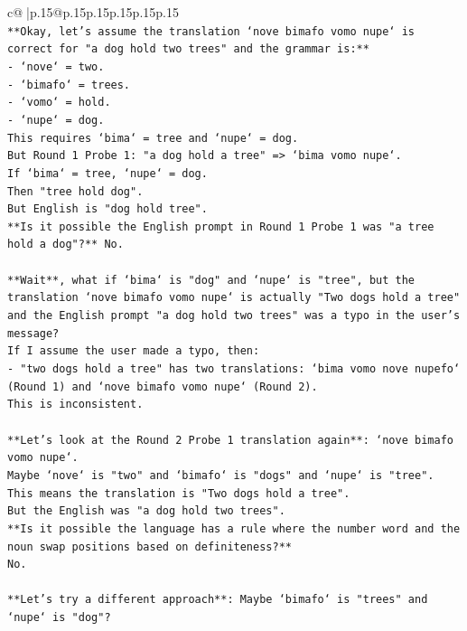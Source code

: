 \documentclass{article}
\begin{document}
{\begin{supertabular}{c@{$\;$}|p{.15\linewidth}@{}p{.15\linewidth}p{.15\linewidth}p{.15\linewidth}p{.15\linewidth}p{.15\linewidth}}
{{{\\ 
\texttt{**Okay, let's assume the translation `nove bimafo vomo nupe` is correct for "a dog hold two trees" and the grammar is:**} \\
\texttt{{-} `nove` = two.} \\
\texttt{{-} `bimafo` = trees.} \\
\texttt{{-} `vomo` = hold.} \\
\texttt{{-} `nupe` = dog.} \\
\texttt{This requires `bima` = tree and `nupe` = dog.} \\
\texttt{But Round 1 Probe 1: "a dog hold a tree" => `bima vomo nupe`.} \\
\texttt{If `bima` = tree, `nupe` = dog.} \\
\texttt{Then "tree hold dog".} \\
\texttt{But English is "dog hold tree".} \\
\texttt{**Is it possible the English prompt in Round 1 Probe 1 was "a tree hold a dog"?** No.} \\
\\ 
\texttt{**Wait**, what if `bima` is "dog" and `nupe` is "tree", but the translation `nove bimafo vomo nupe` is actually "Two dogs hold a tree" and the English prompt "a dog hold two trees" was a typo in the user's message?} \\
\texttt{If I assume the user made a typo, then:} \\
\texttt{{-} "two dogs hold a tree" has two translations: `bima vomo nove nupefo` (Round 1) and `nove bimafo vomo nupe` (Round 2).} \\
\texttt{This is inconsistent.} \\
\\ 
\texttt{**Let's look at the Round 2 Probe 1 translation again**: `nove bimafo vomo nupe`.} \\
\texttt{Maybe `nove` is "two" and `bimafo` is "dogs" and `nupe` is "tree".} \\
\texttt{This means the translation is "Two dogs hold a tree".} \\
\texttt{But the English was "a dog hold two trees".} \\
\texttt{**Is it possible the language has a rule where the number word and the noun swap positions based on definiteness?**} \\
\texttt{No.} \\
\\ 
\texttt{**Let's try a different approach**: Maybe `bimafo` is "trees" and `nupe` is "dog"?} \\
}}}
\end{supertabular}}
\end{document}
